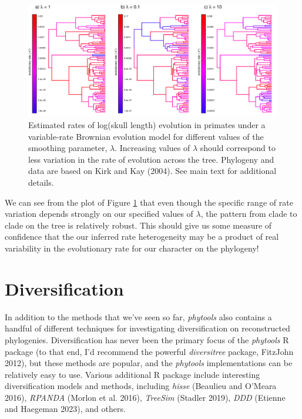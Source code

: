 \documentclass[fleqn,10pt,lineno]{wlpeerj} %
\begin{document}
\begin{figure}
\includegraphics[width=1\linewidth]{Revell.phytools-v2_peerj_files/figure-latex/multirateBM-1} \caption{Estimated rates of log(skull length) evolution in primates under a variable-rate Brownian evolution model for different values of the smoothing parameter, $\lambda$. Increasing values of $\lambda$ should correspond to less variation in the rate of evolution across the tree. Phylogeny and data are based on Kirk and Kay (2004). See main text for additional details.}\label{fig:multirateBM}
\end{figure}

We can see from the plot of Figure \ref{fig:multirateBM} that even though the specific range of rate variation depends strongly on our specified values of \(\lambda\), the pattern from clade to clade on the tree is relatively robust. This should give us some measure of confidence that the our inferred rate heterogeneity may be a product of real variability in the evolutionary rate for our character on the phylogeny!

\hypertarget{diversification}{%
\section{Diversification}\label{diversification}}

In addition to the methods that we've seen so far, \emph{phytools} also contains a handful of different techniques for investigating diversification on reconstructed phylogenies. Diversification has never been the primary focus of the \emph{phytools} R package (to that end, I'd recommend the powerful \emph{diversitree} package, FitzJohn 2012), but these methods are popular, and the \emph{phytools} implementations can be relatively easy to use. Various additional R package include interesting diversification models and methods, including \emph{hisse} (Beaulieu and O'Meara 2016), \emph{RPANDA} (Morlon et al. 2016), \emph{TreeSim} (Stadler 2019), \emph{DDD} (Etienne and Haegeman 2023), and others.
\end{document}
